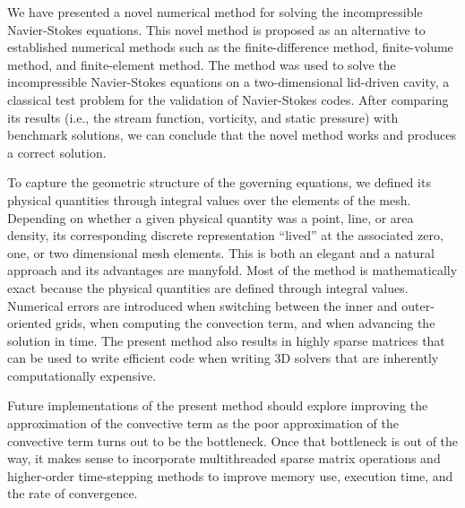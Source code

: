 We have presented a novel numerical method for solving the incompressible Navier-Stokes equations. This novel method is proposed as an alternative to established numerical methods such as the finite-difference method, finite-volume method, and finite-element method. The method was used to solve the incompressible Navier-Stokes equations on a two-dimensional lid-driven cavity, a classical test problem for the validation of Navier-Stokes codes. After comparing its results (i.e., the stream function, vorticity, and static pressure) with benchmark solutions, we can conclude that the novel method works and produces a correct solution.

To capture the geometric structure of the governing equations, we defined its physical quantities through integral values over the elements of the mesh. Depending on whether a given physical quantity was a point, line, or area density, its corresponding discrete representation “lived” at the associated zero, one, or two dimensional mesh elements. This is both an elegant and a natural approach and its advantages are manyfold. Most of the method is mathematically exact because the physical quantities are defined through integral values. Numerical errors are introduced when switching between the inner and outer-oriented grids, when computing the convection term, and when advancing the solution in time. The present method also results in highly sparse matrices that can be used to write efficient code when writing 3D solvers that are inherently computationally expensive.

Future implementations of the present method should explore improving the approximation of the convective term as the poor approximation of the convective term turns out to be the bottleneck. Once that bottleneck is out of the way, it makes sense to incorporate multithreaded sparse matrix operations and higher-order time-stepping methods to improve memory use, execution time, and the rate of convergence.